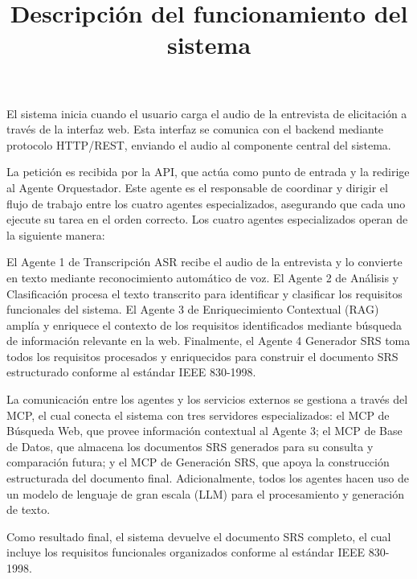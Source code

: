 \title{Descripción del funcionamiento del sistema}
El sistema inicia cuando el usuario carga el audio de la entrevista de elicitación a través de la interfaz web. Esta interfaz se comunica con el backend mediante protocolo HTTP/REST, enviando el audio al componente central del sistema.

La petición es recibida por la API, que actúa como punto de entrada y la redirige al Agente Orquestador. Este agente es el responsable de coordinar y dirigir el flujo de trabajo entre los cuatro agentes especializados, asegurando que cada uno ejecute su tarea en el orden correcto.
Los cuatro agentes especializados operan de la siguiente manera:


El Agente 1 de Transcripción ASR recibe el audio de la entrevista y lo convierte en texto mediante reconocimiento automático de voz. El Agente 2 de Análisis y Clasificación procesa el texto transcrito para identificar y clasificar los requisitos funcionales del sistema. El Agente 3 de Enriquecimiento Contextual (RAG) amplía y enriquece el contexto de los requisitos identificados mediante búsqueda de información relevante en la web. Finalmente, el Agente 4 Generador SRS toma todos los requisitos procesados y enriquecidos para construir el documento SRS estructurado conforme al estándar IEEE 830-1998.

La comunicación entre los agentes y los servicios externos se gestiona a través del MCP, el cual conecta el sistema con tres servidores especializados: el MCP de Búsqueda Web, que provee información contextual al Agente 3; el MCP de Base de Datos, que almacena los documentos SRS generados para su consulta y comparación futura; y el MCP de Generación SRS, que apoya la construcción estructurada del documento final. Adicionalmente, todos los agentes hacen uso de un modelo de lenguaje de gran escala (LLM) para el procesamiento y generación de texto.

Como resultado final, el sistema devuelve el documento SRS completo, el cual incluye los requisitos funcionales organizados conforme al estándar IEEE 830-1998.